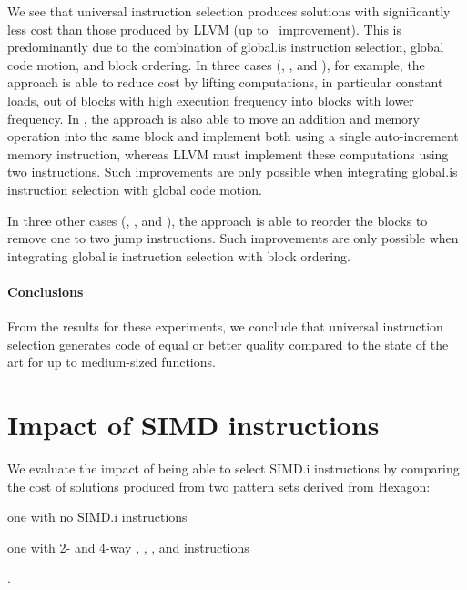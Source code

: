 We see that \gls{universal instruction selection} produces \glspl{solution} with
significantly less cost than those produced by \gls{LLVM} (up to~\printZCNorm{%
  \UnisonVsLlvmHexagonFiveCyclesSpeedupCyclesZeroCenteredSpeedupMax%
} improvement).
%
This is predominantly due to the combination of \gls{global.is}
\gls{instruction selection}, \gls{global code motion}, and \gls{block ordering}.
%
In three cases (, , and
), for example, the approach is able to reduce cost by lifting
computations, in particular constant loads, out of \glspl{block} with high
execution frequency into \glspl{block} with lower frequency.
%
In , the approach is also able to move an addition and
memory \gls{operation} into the same \gls{block} and implement both using a
single auto-increment memory \gls{instruction}, whereas \gls{LLVM} must
implement these computations using two \glspl{instruction}.
%
Such improvements are only possible when integrating \gls{global.is}
\gls{instruction selection} with \gls{global code motion}.

In three other cases (, ,
and ), the approach is able to reorder the
\glspl{block} to remove one to two jump \glspl{instruction}.
%
Such improvements are only possible when integrating \gls{global.is}
\gls{instruction selection} with \gls{block ordering}.


\paragraph{Conclusions}

From the results for these experiments, we conclude that \gls{universal
  instruction selection} generates code of equal or better quality compared to
the state of the art for up to medium-sized \glspl{function}.


\section{Impact of SIMD instructions}

We evaluate the impact of being able to select \gls{SIMD.i} \glspl{instruction}
by comparing the cost of \glspl{solution} produced from two \glspl{pattern set}
derived from \gls{Hexagon}:
%
\begin{patternList}
  \item {}
    one with no \gls{SIMD.i} \glspl{instruction}
  \item {}
    one with \num{2}- and \num{4}-way , , ,
    and  \glspl{instruction}
\end{patternList}.


